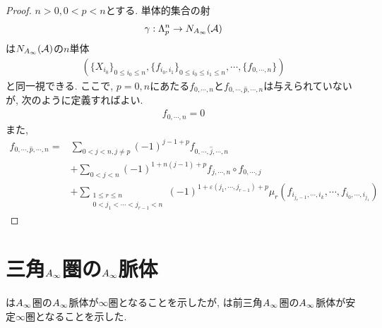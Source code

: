 \documentclass[uplatex, a4paper, 14Q, dvipdfmx]{jsarticle}
\begin{document}
\begin{proof}
  $n>0, 0<p<n$とする. 
  単体的集合の射
  \begin{align*}
    \gamma : \Lambda^n_p \to N_{A_{\infty}}(\mathcal{A})
  \end{align*}
  は$N_{A_{\infty}}(\mathcal{A})$の$n$単体
  \begin{align*}
    ( \{X_{i_0}\}_{0 \leq i_0 \leq n}, \{f_{i_0,i_1}\}_{0 \leq i_0 \leq i_1 \leq n}, \cdots, \{f_{0,\cdots,n}\} )
  \end{align*}
  と同一視できる.
  ここで, $p=0,n$にあたる$f_{0,\cdots,n}$と$f_{0,\cdots,\hat{p},\cdots,n}$は与えられていないが, 次のように定義すればよい. 
  \begin{align*}
    f_{0,\cdots,n} = 0
  \end{align*}
  また, 
  \begin{align*}
    f_{0,\cdots,\hat{p},\cdots,n} = 
    &  \sum_{0<j<n, j \neq p} (-1)^{j-1+p} f_{0,\cdots,\hat{j},\cdots,n} \\
    &+ \sum_{0<j<n} (-1)^{1+n(j-1)+p} f_{j,\cdots,n} \circ f_{0,\cdots,j} \\
    &+ \sum_{\substack{1 \leq r \leq n \\ 0<j_1<\cdots<j_{r-1}<n}} (-1)^{1+\varepsilon(j_1,\cdots, j_{r-1})+p} 
    \mu_r(f_{i_{j_r-1},\cdots,i_k}, \cdots, f_{i_0,\cdots,i_{j_1}})
  \end{align*}
\end{proof}


\section{三角\texorpdfstring{$A_{\infty}$}{Ainf}圏の\texorpdfstring{$A_{\infty}$}{Ainf}脈体}

\cite{Fao}は$A_{\infty}$圏の$A_{\infty}$脈体が$\infty$圏となることを示したが, \cite{Orn}は前三角$A_{\infty}$圏の$A_{\infty}$脈体が安定$\infty$圏となることを示した. 




\end{document}
